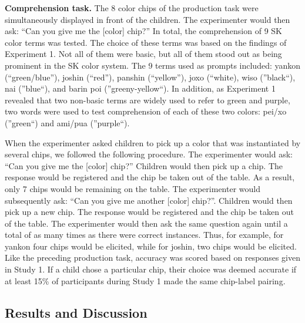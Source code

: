 \documentclass[,man,floatsintext]{apa6}
\theoremstyle{definition}
\theoremstyle{definition}
\theoremstyle{definition}
\theoremstyle{remark}
\begin{document}
\textbf{Comprehension task.} The 8 color chips of the production task
were simultaneously displayed in front of the children. The experimenter
would then ask: \enquote{Can you give me the {[}color{]} chip?} In
total, the comprehension of 9 SK color terms was tested. The choice of
these terms was based on the findings of Experiment 1. Not all of them
were basic, but all of them stood out as being prominent in the SK color
system. The 9 terms used as prompts included: yankon
(\enquote{green/blue}), joshin (\enquote{red}), panshin
(\enquote{yellow}), joxo (\enquote{white), wiso (}black\enquote{), nai
(}blue\enquote{), and barin poi (}greeny-yellow\enquote{). In addition,
as Experiment 1 revealed that two non-basic terms are widely used to
refer to green and purple, two words were used to test comprehension of
each of these two colors: pei/xo (}green\enquote{) and ami/pua
(}purple``).

When the experimenter asked children to pick up a color that was
instantiated by several chips, we followed the following procedure. The
experimenter would ask: \enquote{Can you give me the {[}color{]} chip?}
Children would then pick up a chip. The response would be registered and
the chip be taken out of the table. As a result, only 7 chips would be
remaining on the table. The experimenter would subsequently ask:
\enquote{Can you give me another {[}color{]} chip?}. Children would then
pick up a new chip. The response would be registered and the chip be
taken out of the table. The experimenter would then ask the same
question again until a total of as many times as there were correct
instances. Thus, for example, for yankon four chips would be elicited,
while for joshin, two chips would be elicited. Like the preceding
production task, accuracy was scored based on responses given in Study
1. If a child chose a particular chip, their choice was deemed accurate
if at least 15\% of participants during Study 1 made the same chip-label
pairing.

\subsection{Results and Discussion}\label{results-and-discussion-1}
\end{document}
